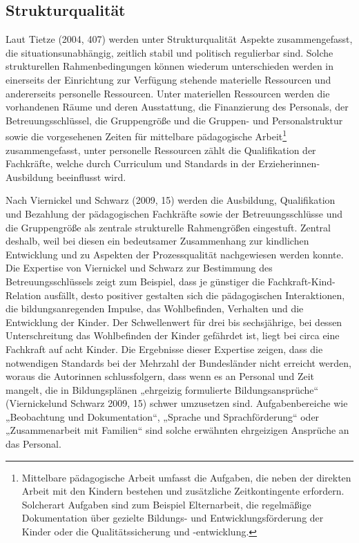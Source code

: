 \subsection{Strukturqualität}
\label{subsec:Strukturquali}
Laut Tietze (2004, 407) werden unter Strukturqualität Aspekte zusammengefasst, die situationsunabhängig, zeitlich stabil und politisch regulierbar sind. Solche strukturellen Rahmenbedingungen können wiederum unterschieden werden in einerseits der Einrichtung zur Verfügung stehende materielle Ressourcen und andererseits personelle Ressourcen. Unter materiellen Ressourcen werden die vorhandenen Räume und deren Ausstattung, die Finanzierung des Personals, der Betreuungsschlüssel, die Gruppengröße und die Gruppen- und Personalstruktur sowie die vorgesehenen Zeiten für mittelbare pädagogische Arbeit\footnote{ Mittelbare pädagogische Arbeit umfasst die Aufgaben, die neben der direkten Arbeit mit den Kindern bestehen und zusätzliche Zeitkontingente erfordern. Solcherart Aufgaben sind zum Beispiel Elternarbeit, die regelmäßige Dokumentation über gezielte Bildungs- und Entwicklungsförderung der Kinder oder  die Qualitätssicherung und -entwicklung.} zusammengefasst, unter personelle Ressourcen zählt die Qualifikation der Fachkräfte, welche durch Curriculum und Standards in der Erzieherinnen-Ausbildung beeinflusst wird. 

Nach Viernickel und Schwarz (2009, 15) werden die Ausbildung, Qualifikation und Bezahlung der pädagogischen Fachkräfte sowie der Betreuungsschlüsse und die Gruppengröße als zentrale strukturelle Rahmengrößen eingestuft. Zentral deshalb, weil bei diesen ein bedeutsamer Zusammenhang zur kindlichen Entwicklung und zu Aspekten der Prozessqualität nachgewiesen werden konnte. 
Die Expertise von Viernickel und Schwarz zur Bestimmung des Betreuungsschlüssels zeigt zum Beispiel, dass je günstiger die Fachkraft-Kind-Relation ausfällt, desto positiver gestalten sich die pädagogischen Interaktionen, die bildungsanregenden Impulse, das Wohlbefinden, Verhalten und die Entwicklung der Kinder. Der Schwellenwert für drei bis sechsjährige, bei dessen Unterschreitung das Wohlbefinden der Kinder gefährdet ist, liegt bei circa eine Fachkraft auf acht Kinder. Die Ergebnisse dieser Expertise zeigen, dass die notwendigen Standards bei der Mehrzahl der Bundesländer nicht erreicht werden, woraus die Autorinnen schlussfolgern, dass wenn es an Personal und Zeit mangelt, die in Bildungsplänen „ehrgeizig formulierte Bildungsansprüche“ (Viernickelund Schwarz 2009, 15) schwer umzusetzen sind. Aufgabenbereiche wie „Beobachtung und Dokumentation“, „Sprache und Sprachförderung“ oder „Zusammenarbeit mit Familien“ sind solche erwähnten ehrgeizigen Ansprüche an das Personal.

